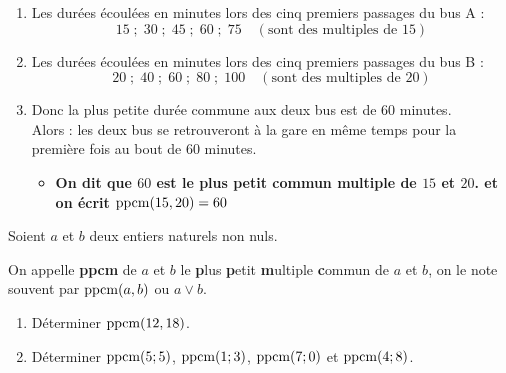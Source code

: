 \documentclass[10pt, a4paper]{article}
\begin{document}
\begin{Solution}[ACTIVITÉ][4]
\begin{enumerate}[leftmargin=*,itemsep=0.5pt]
    \item Les durées écoulées en minutes lors des cinq premiers passages du bus A :
\[15 \; ; \; 30 \; ; \; 45 \; ; \; 60 \; ; \; 75 \quad (\text{sont des multiples de~} 15) \]

    \item Les durées écoulées en minutes lors des cinq premiers passages du bus B :
\[20 \; ; \; 40 \; ; \; 60 \; ; \; 80 \; ; \; 100 \quad (\text{sont des multiples de~} 20) \]

    \item Donc la plus petite durée commune aux deux bus est de 60 minutes. \\
    Alors : les deux bus se retrouveront à la gare en même temps pour la première fois au bout de 60 minutes.
    
    \begin{itemize}[label=$\blacktriangleright$, leftmargin=*, nosep]
    \item \textbf{On dit que $60$ est le \textcolor{PrimaryColor}{plus petit commun multiple}  de $15$ et $20$. et on écrit $\operatorname{ppcm}(15, 20) = 60$}
    \end{itemize}
\end{enumerate}
\end{Solution}



\begin{Definition}[]
Soient $a$ et $b$ deux entiers naturels non nuls.

On appelle \textbf{ppcm} de $a$ et $b$ le \textbf{p}lus \textbf{p}etit \textbf{m}ultiple \textbf{c}ommun de $a$ et $b$, on le note souvent par
$\operatorname{ppcm}(a, b)$ ou $a \vee b$.
\end{Definition}

\begin{Application}[][10 min]
\begin{enumerate}[leftmargin=*,itemsep=0.5pt]
    \item Déterminer $\operatorname{ppcm}(12, 18)$.
    
    \item Déterminer $\operatorname{ppcm}(5;5)$, $\operatorname{ppcm}(1;3)$, $\operatorname{ppcm}(7;0)$ et $\operatorname{ppcm}(4;8)$.
\end{enumerate}
\end{Application}
\end{document}
